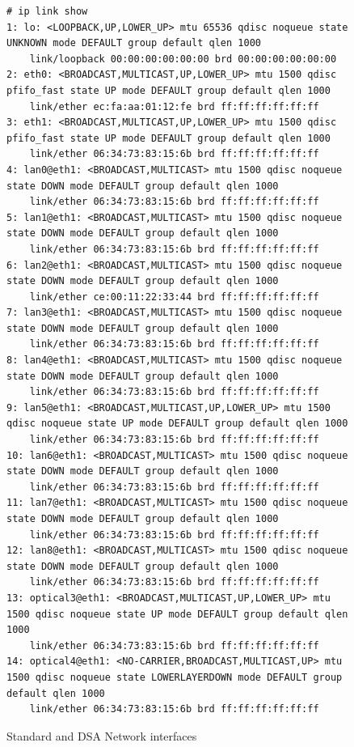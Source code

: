 \documentclass[letterpaper]{article}
\begin{document}
\begin{figure}
  \begin{minipage}{\textwidth}
    \tiny
\begin{verbatim}
# ip link show
1: lo: <LOOPBACK,UP,LOWER_UP> mtu 65536 qdisc noqueue state UNKNOWN mode DEFAULT group default qlen 1000
    link/loopback 00:00:00:00:00:00 brd 00:00:00:00:00:00
2: eth0: <BROADCAST,MULTICAST,UP,LOWER_UP> mtu 1500 qdisc pfifo_fast state UP mode DEFAULT group default qlen 1000
    link/ether ec:fa:aa:01:12:fe brd ff:ff:ff:ff:ff:ff
3: eth1: <BROADCAST,MULTICAST,UP,LOWER_UP> mtu 1500 qdisc pfifo_fast state UP mode DEFAULT group default qlen 1000
    link/ether 06:34:73:83:15:6b brd ff:ff:ff:ff:ff:ff
4: lan0@eth1: <BROADCAST,MULTICAST> mtu 1500 qdisc noqueue state DOWN mode DEFAULT group default qlen 1000
    link/ether 06:34:73:83:15:6b brd ff:ff:ff:ff:ff:ff
5: lan1@eth1: <BROADCAST,MULTICAST> mtu 1500 qdisc noqueue state DOWN mode DEFAULT group default qlen 1000
    link/ether 06:34:73:83:15:6b brd ff:ff:ff:ff:ff:ff
6: lan2@eth1: <BROADCAST,MULTICAST> mtu 1500 qdisc noqueue state DOWN mode DEFAULT group default qlen 1000
    link/ether ce:00:11:22:33:44 brd ff:ff:ff:ff:ff:ff
7: lan3@eth1: <BROADCAST,MULTICAST> mtu 1500 qdisc noqueue state DOWN mode DEFAULT group default qlen 1000
    link/ether 06:34:73:83:15:6b brd ff:ff:ff:ff:ff:ff
8: lan4@eth1: <BROADCAST,MULTICAST> mtu 1500 qdisc noqueue state DOWN mode DEFAULT group default qlen 1000
    link/ether 06:34:73:83:15:6b brd ff:ff:ff:ff:ff:ff
9: lan5@eth1: <BROADCAST,MULTICAST,UP,LOWER_UP> mtu 1500 qdisc noqueue state UP mode DEFAULT group default qlen 1000
    link/ether 06:34:73:83:15:6b brd ff:ff:ff:ff:ff:ff
10: lan6@eth1: <BROADCAST,MULTICAST> mtu 1500 qdisc noqueue state DOWN mode DEFAULT group default qlen 1000
    link/ether 06:34:73:83:15:6b brd ff:ff:ff:ff:ff:ff
11: lan7@eth1: <BROADCAST,MULTICAST> mtu 1500 qdisc noqueue state DOWN mode DEFAULT group default qlen 1000
    link/ether 06:34:73:83:15:6b brd ff:ff:ff:ff:ff:ff
12: lan8@eth1: <BROADCAST,MULTICAST> mtu 1500 qdisc noqueue state DOWN mode DEFAULT group default qlen 1000
    link/ether 06:34:73:83:15:6b brd ff:ff:ff:ff:ff:ff
13: optical3@eth1: <BROADCAST,MULTICAST,UP,LOWER_UP> mtu 1500 qdisc noqueue state UP mode DEFAULT group default qlen 1000
    link/ether 06:34:73:83:15:6b brd ff:ff:ff:ff:ff:ff
14: optical4@eth1: <NO-CARRIER,BROADCAST,MULTICAST,UP> mtu 1500 qdisc noqueue state LOWERLAYERDOWN mode DEFAULT group default qlen 1000
    link/ether 06:34:73:83:15:6b brd ff:ff:ff:ff:ff:ff
\end{verbatim}
  \end{minipage}
  \caption{Standard and DSA Network interfaces}
  \label{network-interfaces}
\end{figure}
\end{document}
